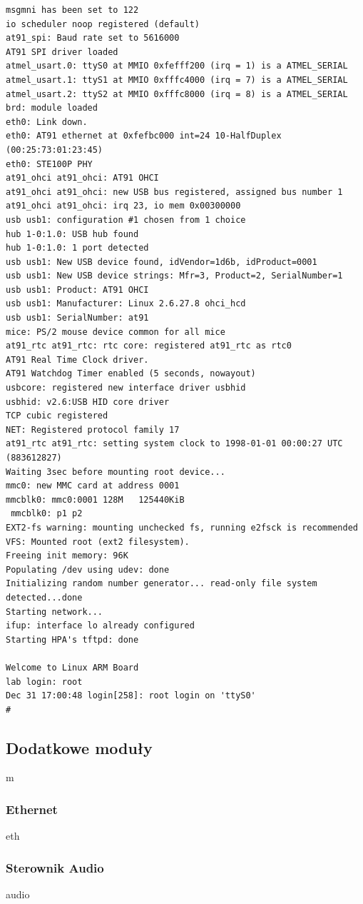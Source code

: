 \documentclass[a4paper,12pt]{book}
\begin{document}
\begin{lstlisting}[basicstyle={\footnotesize\ttfamily}]
msgmni has been set to 122
io scheduler noop registered (default)
at91_spi: Baud rate set to 5616000
AT91 SPI driver loaded
atmel_usart.0: ttyS0 at MMIO 0xfefff200 (irq = 1) is a ATMEL_SERIAL
atmel_usart.1: ttyS1 at MMIO 0xfffc4000 (irq = 7) is a ATMEL_SERIAL
atmel_usart.2: ttyS2 at MMIO 0xfffc8000 (irq = 8) is a ATMEL_SERIAL
brd: module loaded
eth0: Link down.
eth0: AT91 ethernet at 0xfefbc000 int=24 10-HalfDuplex (00:25:73:01:23:45)
eth0: STE100P PHY
at91_ohci at91_ohci: AT91 OHCI
at91_ohci at91_ohci: new USB bus registered, assigned bus number 1
at91_ohci at91_ohci: irq 23, io mem 0x00300000
usb usb1: configuration #1 chosen from 1 choice
hub 1-0:1.0: USB hub found
hub 1-0:1.0: 1 port detected
usb usb1: New USB device found, idVendor=1d6b, idProduct=0001
usb usb1: New USB device strings: Mfr=3, Product=2, SerialNumber=1
usb usb1: Product: AT91 OHCI
usb usb1: Manufacturer: Linux 2.6.27.8 ohci_hcd
usb usb1: SerialNumber: at91
mice: PS/2 mouse device common for all mice
at91_rtc at91_rtc: rtc core: registered at91_rtc as rtc0
AT91 Real Time Clock driver.
AT91 Watchdog Timer enabled (5 seconds, nowayout)
usbcore: registered new interface driver usbhid
usbhid: v2.6:USB HID core driver
TCP cubic registered
NET: Registered protocol family 17
at91_rtc at91_rtc: setting system clock to 1998-01-01 00:00:27 UTC (883612827)
Waiting 3sec before mounting root device...
mmc0: new MMC card at address 0001
mmcblk0: mmc0:0001 128M   125440KiB 
 mmcblk0: p1 p2
EXT2-fs warning: mounting unchecked fs, running e2fsck is recommended
VFS: Mounted root (ext2 filesystem).
Freeing init memory: 96K
Populating /dev using udev: done
Initializing random number generator... read-only file system detected...done
Starting network...
ifup: interface lo already configured
Starting HPA's tftpd: done

Welcome to Linux ARM Board
lab login: root
Dec 31 17:00:48 login[258]: root login on 'ttyS0'
# 
				\end{lstlisting}
				
			\subsection{Dodatkowe moduły}
				\label{sec:linux_modules}
				m
				\subsubsection{Ethernet}
					eth
				\subsubsection{Sterownik Audio}
					audio
\end{document}
